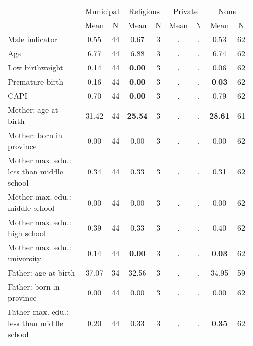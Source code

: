 \begin{tabular}{l c c c c c c c c}
\toprule
& \multicolumn{2}{c}{Municipal} & \multicolumn{2}{c}{Religious} & \multicolumn{2}{c}{Private} & \multicolumn{2}{c}{None} \\
& \scriptsize Mean & \scriptsize N & \scriptsize Mean & \scriptsize N & \scriptsize Mean & \scriptsize N & \scriptsize Mean & \scriptsize N \\
\midrule
Male indicator &      0.55 &        44 &      0.67 &         3 &         . & . &      0.53 &        62 \\
Age &      6.77 &        44 &      6.88 &         3 &         . & . &      6.74 &        62 \\
Low birthweight &      0.14 &        44 & \textbf{     0.00} &         3 &         . & . &      0.06 &        62 \\
Premature birth &      0.16 &        44 & \textbf{     0.00} &         3 &         . & . & \textbf{     0.03} &        62 \\
CAPI &      0.70 &        44 & \textbf{     0.00} &         3 &         . & . &      0.79 &        62 \\
Mother: age at birth &     31.42 &        44 & \textbf{    25.54} &         3 &         . & . & \textbf{    28.61} &        61 \\
Mother: born in province &      0.00 &        44 &      0.00 &         3 &         . & . &      0.00 &        62 \\
Mother max. edu.: less than middle school &      0.34 &        44 &      0.33 &         3 &         . & . &      0.31 &        62 \\
Mother max. edu.: middle school &      0.00 &        44 &      0.00 &         3 &         . & . &      0.00 &        62 \\
Mother max. edu.: high school &      0.39 &        44 &      0.33 &         3 &         . & . &      0.40 &        62 \\
Mother max. edu.: university &      0.14 &        44 & \textbf{     0.00} &         3 &         . & . & \textbf{     0.03} &        62 \\
Father: age at birth &     37.07 &        34 &     32.56 &         3 &         . & . &     34.95 &        59 \\
Father: born in province &      0.00 &        44 &      0.00 &         3 &         . & . &      0.00 &        62 \\
Father max. edu.: less than middle school &      0.20 &        44 &      0.33 &         3 &         . & . & \textbf{     0.35} &        62 \\

\end{tabular}
